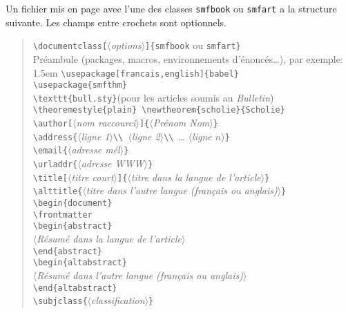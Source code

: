 \documentclass[11pt,francais]{smfart}
\def\meta#1{$\langle${\it #1}$\rangle$}
\begin{document}
Un fichier mis en page avec l'une des classes \texttt{smfbook}
ou \texttt{smfart} a la structure suivante.
Les champs entre crochets sont optionnels.

\begin{verse}
\verb|\documentclass[|\meta{options}\verb|]{smfbook| ou \verb|smfart}|\\
Pr\'eambule (packages, macros, environnements d'\'enonc\'es\dots), par
exemple: \\
{\advance\leftskip 1.5em
\verb|\usepackage[francais,english]{babel}| \\
\verb|\usepackage{smfthm}|\\
\verb|\texttt{bull.sty}|\quad (pour les articles soumis au \textsl{Bulletin})\\
\verb|\theoremestyle{plain} \newtheorem{scholie}{Scholie}|\\
}
\smallskip
\verb|\author[|\meta{nom raccourci}\verb|]{|\meta{Pr\'enom Nom}\verb|}| \\
\verb|\address{|\meta{ligne 1}\verb|\\ |\meta{ligne 2}\verb|\\ |\dots
\meta{ligne $n$}\verb|}| \\
\verb|\email{|\meta{adresse m\'el}\verb|}| \\
\verb|\urladdr{|\meta{adresse WWW}\verb|}|\\
\smallskip
\verb|\title[|\meta{titre court}\verb|]{|\meta{titre dans la langue de
    l'article}\verb|}| \\
\verb|\alttitle{|\meta{titre dans l'autre langue
    (fran\c{c}ais ou anglais)}\verb|}| \\
\bigskip
\verb|\begin{document}|\\
\verb|\frontmatter|\\
\smallskip
\verb|\begin{abstract}|\\
\quad\meta{R\'esum\'e dans la langue de l'article}\\
\verb|\end{abstract}|\\
\smallskip
\verb|\begin{altabstract}|\\
\quad\meta{R\'esum\'e dans l'autre langue (fran\c{c}ais ou anglais)}\\
\verb|\end{altabstract}| \\
\smallskip
\verb|\subjclass{|\meta{classification}\verb|}| \\

\end{verse}
\end{document}
